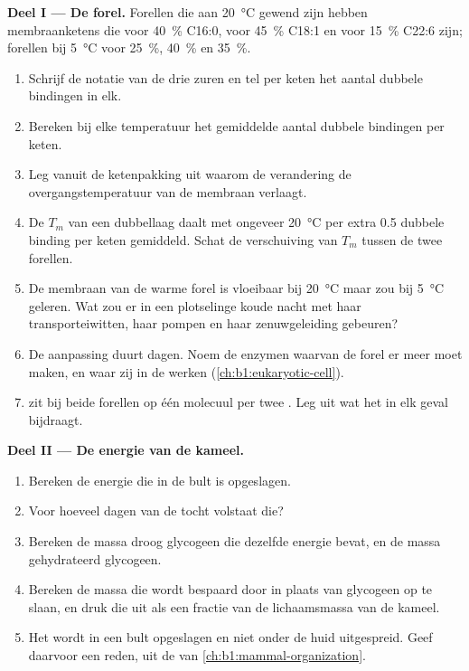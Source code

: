 \begin{problem}
\medskip
\noindent\textbf{Deel I --- De forel.}
Forellen die aan \qty{20}{\celsius} gewend zijn hebben membraanketens die voor
\qty{40}{\%} C16:0, voor \qty{45}{\%} C18:1 en voor \qty{15}{\%} C22:6 zijn;
forellen bij \qty{5}{\celsius} voor \qty{25}{\%}, \qty{40}{\%} en \qty{35}{\%}.
\begin{enumerate}
  \item Schrijf de notatie van de drie zuren en tel per keten het aantal
        dubbele bindingen in elk.
  \item Bereken bij elke temperatuur het gemiddelde aantal dubbele
        bindingen per keten.
  \item Leg vanuit de ketenpakking uit waarom de verandering de
        overgangstemperatuur van de membraan verlaagt.
  \item De $T_m$ van een dubbellaag daalt met ongeveer \qty{20}{\celsius}
        per extra \qty{0.5}{} dubbele binding per keten gemiddeld. Schat de
        verschuiving van $T_m$ tussen de twee forellen.
  \item De membraan van de warme forel is vloeibaar bij \qty{20}{\celsius}
        maar zou bij \qty{5}{\celsius} geleren. Wat zou er in een plotselinge
        koude nacht met haar transporteiwitten, haar pompen en haar
        zenuwgeleiding gebeuren?
  \item De aanpassing duurt dagen. Noem de enzymen waarvan de forel er meer
        moet maken, en waar zij in de  werken (\cref{ch:b1:eukaryotic-cell}).
  \item {} zit bij beide forellen op één molecuul per twee
        . Leg uit wat het in elk geval bijdraagt.
\end{enumerate}

\medskip
\noindent\textbf{Deel II --- De energie van de kameel.}
\begin{enumerate}[resume]
  \item Bereken de energie die in de bult is opgeslagen.
  \item Voor hoeveel dagen van de tocht volstaat die?
  \item Bereken de massa droog glycogeen die dezelfde energie bevat, en de
        massa gehydrateerd glycogeen.
  \item Bereken de massa die wordt bespaard door  in plaats van
        glycogeen op te slaan, en druk die uit als een fractie van de
        lichaamsmassa van de kameel.
  \item Het  wordt in een bult opgeslagen en niet onder de huid
        uitgespreid. Geef daarvoor een reden, uit de  van
        \cref{ch:b1:mammal-organization}.
\end{enumerate}


\end{problem}
